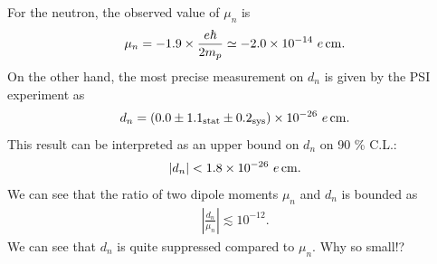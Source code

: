 \documentclass[11pt,a4paper]{article}
\begin{document}
For the neutron, the observed value of $\mu_n$ is \cite{ParticleDataGroup:2024cfk}
\begin{align}
    \mu_n = -1.9 \times \frac{e\hbar}{2m_p} \simeq -2.0 \times 10^{-14}~e\,{\rm cm}.
\end{align}
On the other hand, the most precise measurement on $d_n$ is given by the PSI experiment as \cite{Abel:2020pzs}
\begin{align}
    d_n = (0.0 \pm 1.1_{\rm stat} \pm 0.2_{\rm sys}) \times 10^{-26}~e\,{\rm cm}.
\end{align}
This result can be interpreted as an upper bound on $d_n$ on 90 \% C.L.:
\begin{align}
    |d_n| < 1.8 \times 10^{-26}~e\,{\rm cm}. \label{eq:bound on neutron EDM}
\end{align}
%
We can see that the ratio of two dipole moments $\mu_n$ and $d_n$ is bounded as
\begin{align}
\left|\frac{d_n}{\mu_n}\right| \lesssim 10^{-12}.
\end{align}
We can see that $d_n$ is quite suppressed compared to $\mu_n$. Why so small!?
\end{document}
